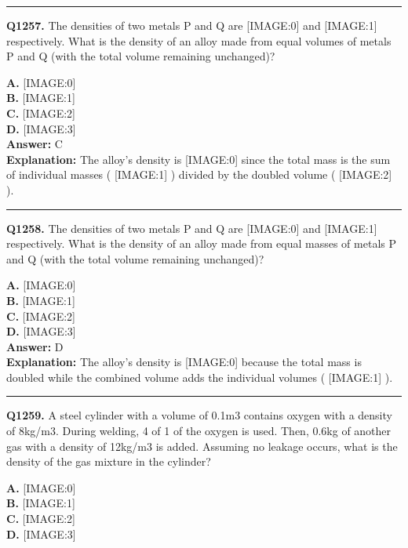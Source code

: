 \documentclass[12pt]{article}
\begin{document}
\hrule
\vspace{1em}


\noindent
\textbf{Q1257.} The densities of two metals P and Q are
[IMAGE:0]
and
[IMAGE:1]
respectively. What is the density of an alloy made from equal volumes of metals P and Q (with the total volume remaining unchanged)?



\textbf{A.} [IMAGE:0] \\
\textbf{B.} [IMAGE:1] \\
\textbf{C.} [IMAGE:2] \\
\textbf{D.} [IMAGE:3] \\

\textbf{Answer:} C \\
\textbf{Explanation:} The alloy's density is
[IMAGE:0]
since the total mass is the sum of individual masses (
[IMAGE:1]
) divided by the doubled volume (
[IMAGE:2]
).

\hrule
\vspace{1em}


\noindent
\textbf{Q1258.} The densities of two metals P and Q are
[IMAGE:0]
and
[IMAGE:1]
respectively. What is the density of an alloy made from equal masses of metals P and Q (with the total volume remaining unchanged)?



\textbf{A.} [IMAGE:0] \\
\textbf{B.} [IMAGE:1] \\
\textbf{C.} [IMAGE:2] \\
\textbf{D.} [IMAGE:3] \\

\textbf{Answer:} D \\
\textbf{Explanation:} The alloy's density is
[IMAGE:0]
because the total mass is doubled while the combined volume adds the individual volumes (
[IMAGE:1]
).

\hrule
\vspace{1em}


\noindent
\textbf{Q1259.} A steel cylinder with a volume of 0.1m3 contains oxygen with a density of 8kg/m3. During welding, 4 of 1 of the oxygen is used. Then, 0.6kg of another gas with a density of 12kg/m3 is added. Assuming no leakage occurs, what is the density of the gas mixture in the cylinder?



\textbf{A.} [IMAGE:0] \\
\textbf{B.} [IMAGE:1] \\
\textbf{C.} [IMAGE:2] \\
\textbf{D.} [IMAGE:3] \\
\end{document}
